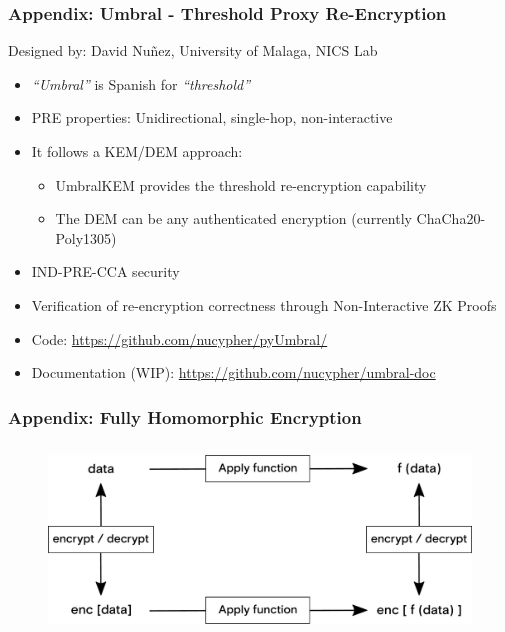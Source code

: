\documentclass[xetex,mathsans,sans,aspectratio=169]{beamer}
\begin{document}
    \begin{frame}
      \frametitle{Appendix: Umbral - Threshold Proxy Re-Encryption}
      Designed by: David Nu\~{n}ez, University of Malaga, NICS Lab
      \begin{itemize}
          \item \emph{``Umbral''} is Spanish for \emph{``threshold''}
          \item PRE properties: Unidirectional, single-hop, non-interactive
          \item It follows a KEM/DEM approach:
          \begin{itemize}
              \item UmbralKEM provides the threshold re-encryption capability
              \item The DEM can be any authenticated encryption (currently ChaCha20-Poly1305)
          \end{itemize}
          \item IND-PRE-CCA security
          \item Verification of re-encryption correctness through Non-Interactive ZK Proofs
          \item Code: \url{https://github.com/nucypher/pyUmbral/}
          \item Documentation (WIP): \url{https://github.com/nucypher/umbral-doc}
      \end{itemize}
    \end{frame}

    \begin{frame}
      \frametitle{Appendix: Fully Homomorphic Encryption}
      \begin{figure}
        \centering
        \includegraphics[height=5cm]{pdf/fhe.pdf}
      \end{figure}
    \end{frame}
\end{document}

